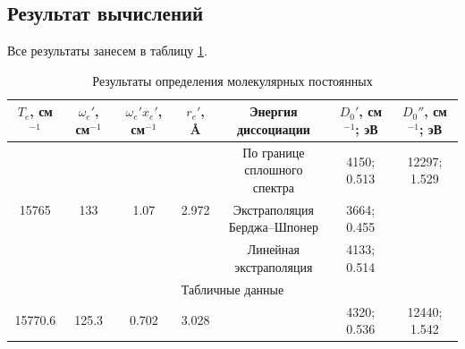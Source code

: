 \subsection{Результат вычислений}
Все результаты занесем в таблицу \ref{table:final_results}.
\begin{table}[h!]
	\centering
	\caption{Результаты определения молекулярных постоянных}
	\begin{tabular}{|c|c|c|c|c|c|c|}
		\hline
		$T_e$, см$^{-1}$ & $\omega_e'$, см$^{-1}$ & $\omega_e'x_e'$, см$^{-1}$ & $r_e'$, \AA & Энергия диссоциации & $D_0'$, см$^{-1}$; эВ & $D_0''$, см$^{-1}$; эВ \bigstrut\\
		\hline
		\multirow{3}[6]{*}{15765} & \multirow{3}[6]{*}{133} & \multirow{3}[6]{*}{1.07} & \multirow{3}[6]{*}{2.972} & \makecell{По границе \\сплошного спектра} & 4150; 0.513 & 12297; 1.529 \bigstrut\\
		\cline{5-7}       &   &   &   & \makecell{Экстраполяция \\Берджа--Шпонер} & 3664; 0.455 &  \bigstrut\\
		\cline{5-7}       &   &   &   & \makecell{Линейная \\экстраполяция} & 4133; 0.514 &  \bigstrut\\
		\hline
		\multicolumn{7}{|c|}{Табличные данные} \bigstrut\\
		\hline
		15770.6& 125.3  & 0.702  &  3.028 &   & 4320; 0.536  & 12440; 1.542 \bigstrut\\
		\hline
		
	\end{tabular}%
	\label{table:final_results}%
\end{table}%

